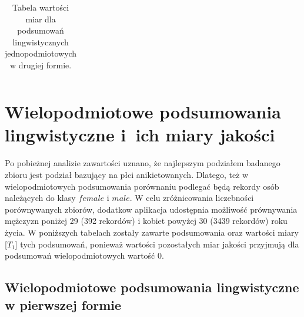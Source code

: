 \documentclass{classrep}
\begin{document}
\begin{center}
\begin{table}[H]
\begin{adjustbox}{center=11cm}
\begin{tabularx}{\textwidth}{ccccccccccccc}
  \end{tabularx}
  \end{adjustbox}
  \caption{Tabela wartości miar dla podsumowań lingwistycznych jednopodmiotowych w drugiej formie.}
\end{table}
\end{center}
 
% 
% 
\section{Wielopodmiotowe podsumowania lingwistyczne i~ich miary jakości} 

Po pobieżnej analizie zawartości uznano, że najlepszym podziałem badanego zbioru \cite{database} jest podział bazujący na płci 
anikietowanych. Dlatego, też w wielopodmiotowych podsumowania porównaniu podlegać będą rekordy osób należących do klasy \(female\) i \(male\). W celu zróżnicowania liczebności porównywanych zbiorów, dodatkow aplikacja udostępnia możliwość
prównywania mężczyzn poniżej 29 (392 rekordów) i kobiet powyżej 30 (3439 rekordów) roku życia.
W poniższych tabelach zostały zawarte podsumowania oraz wartości miary [$T_1$] tych podsumowań, ponieważ wartości pozostałych miar jakości przyjmują dla podsumowań wielopodmiotowych wartość 0.

\subsection{Wielopodmiotowe podsumowania lingwistyczne w pierwszej formie}
\end{document}
